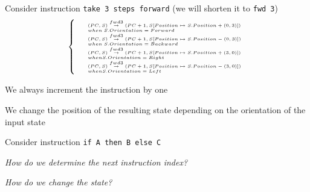 \documentclass{beamer}
\begin{document}
\begin{slide}{
\item Consider instruction \texttt{take 3 steps forward} (we will shorten it to \texttt{fwd 3})
\begin{align*}
\tiny
\left\lbrace
\begin{array}{l l}
&(PC,S) \overset{fwd 3}{\rightarrow} (PC+1,S[Position \mapsto S.Position+(0,3)])\\
&when \; S.Orientation=Forward \\
&(PC,S) \overset{fwd 3}{\rightarrow} (PC+1,S[Position \mapsto S.Position-(0,3)]) \\
&when \; S.Orientation=Backward \\
&(PC,S) \overset{fwd 3}{\rightarrow} (PC+1,S[Position \mapsto S.Position+(3,0)]) \\
&when S.Orientation=Right \\
&(PC,S) \overset{fwd 3}{\rightarrow} (PC+1,S[Position \mapsto S.Position-(3,0)]) \\
&when S.Orientation=Left \\
\end{array}
\right.
\end{align*}
\item We always increment the instruction by one
\item We change the position of the resulting state depending on the orientation of the input state
}\end{slide}

\begin{slide}{
\item Consider instruction \texttt{if A then B else C}
\item \textit{How do we determine the next instruction index?}
\item \textit{How do we change the state?}
}\end{slide}

\end{document}
